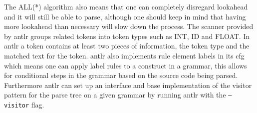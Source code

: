 The ALL(*) algorithm also means that one can completely disregard lookahead and it will still be able to parse, although one should keep in mind that having more lookahead than necessary will slow down the process.
The scanner provided by \acrshort{antlr} groups related tokens into token types such as INT, ID and FLOAT.
In \acrshort{antlr} a token contains at least two pieces of information, the token type and the matched text for the token.
\acrshort{antlr} also implements rule element labels in its \acrfull{cfg} which means one can apply label rules to a construct in a grammar, this allows for conditional steps in the grammar based on the source code being parsed.
Furthermore \acrshort{antlr} can set up an interface and base implementation of the visitor pattern for the parse tree on a given grammar by running \acrshort{antlr} with the \texttt{--visitor} flag.\citep{ALLSTAR, LLSTAR, antlr4_Book}


